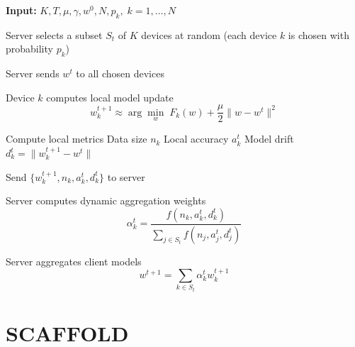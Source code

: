 \documentclass[12pt]{book}
\begin{document}
\begin{algorithm}[H]
\caption{FedProx with Dynamic Weighted Aggregation}
\label{alg:fedprox_dynamic}
\begin{algorithmic}[H]
\STATE \textbf{Input:} $K, T, \mu, \gamma, w^0, N, p_k,\; k=1,\dots,N$


    \STATE Server selects a subset $S_t$ of $K$ devices at random
    \STATE \hspace{0.5cm}(each device $k$ is chosen with probability $p_k$)

    \STATE Server sends $w^t$ to all chosen devices


        \STATE Device $k$ computes local model update
        \[
        w_k^{t+1} \approx 
        \arg\min_{w} \; F_k(w) + \frac{\mu}{2}\|w - w^t\|^2
        \]

        \STATE Compute local metrics
        \STATE \hspace{0.5cm}Data size $n_k$
        \STATE \hspace{0.5cm}Local accuracy $a_k^t$
        \STATE \hspace{0.5cm}Model drift $d_k^t = \|w_k^{t+1} - w^t\|$

        \STATE Send $\{w_k^{t+1}, n_k, a_k^t, d_k^t\}$ to server

    \ENDFOR

    \STATE Server computes dynamic aggregation weights
    \[
    \alpha_k^t =
    \frac{f(n_k, a_k^t, d_k^t)}
    {\sum_{j \in S_t} f(n_j, a_j^t, d_j^t)}
    \]

    \STATE Server aggregates client models
    \[
    w^{t+1} =
    \sum_{k \in S_t} \alpha_k^t w_k^{t+1}
    \]

\ENDFOR
\end{algorithmic}
\end{algorithm}

\section{SCAFFOLD}
\end{document}
